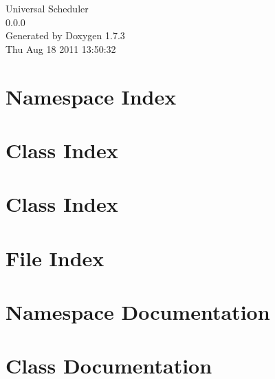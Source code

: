 \documentclass[a4paper]{book}
\begin{document}
\hypersetup{pageanchor=false}
\begin{titlepage}
\vspace*{7cm}
\begin{center}
{\Large Universal Scheduler \\[1ex]\large 0.0.0 }\\
\vspace*{1cm}
{\large Generated by Doxygen 1.7.3}\\
\vspace*{0.5cm}
{\small Thu Aug 18 2011 13:50:32}\\
\end{center}
\end{titlepage}
\clearemptydoublepage
{}
\tableofcontents
\clearemptydoublepage
{}
\hypersetup{pageanchor=true}
\chapter{Namespace Index}

\chapter{Class Index}

\chapter{Class Index}

\chapter{File Index}

\chapter{Namespace Documentation}


\chapter{Class Documentation}



























\end{document}
